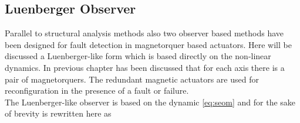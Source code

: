 \subsection{Luenberger Observer} 
\label{sec:simpleObserver}

Parallel to structural analysis methods also two observer based methods have been designed for fault detection in magnetorquer based actuators. Here will be discussed a Luenberger-like form which is based directly on the non-linear dynamics. In previous chapter has been discussed that for each axis there is a pair of magnetorquers. The redundant magnetic actuators are used for reconfiguration in the presence of a fault or failure.\\    The Luenberger-like observer is based on the dynamic  \eqref{eq:seom} and for the sake of brevity is rewritten here as   

